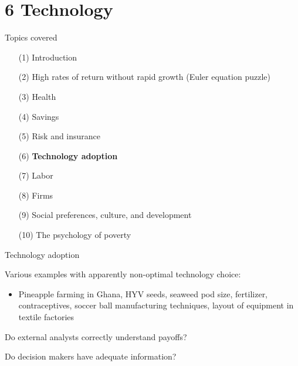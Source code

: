 \documentclass[aspectratio=169, 10pt, handout]{beamer}
\newenvironment{wideitemize}{\itemize\addtolength{\itemsep}{10pt}}{\enditemize}
\begin{document}
\section{6 Technology}

\begin{frame}{Topics covered}

\small 

\begin{enumerate}[(1)]

	\item[(1)] Introduction 
	
	\item[(2)] {High rates of return without rapid growth (Euler equation puzzle)}

	\item[(3)] {Health}
	
	\item[(4)] {Savings}
		
	\item[(5)] {Risk and insurance}

	\item[(6)] \textbf{Technology adoption}
	
	\item[(7)] Labor

	\item[(8)] Firms
	
	\item[(9)] Social preferences, culture, and development
	
	\item[(10)] The psychology of poverty

\end{enumerate}

\end{frame}


\begin{frame}{Technology adoption}

\begin{wideitemize}

	\item Various examples with apparently non-optimal technology choice:

	\begin{itemize}
	
		\item Pineapple farming in Ghana, HYV seeds, seaweed pod size, fertilizer, contraceptives, soccer ball manufacturing techniques, layout of equipment in textile factories

	\end{itemize}

	\item Do external analysts correctly understand payoffs?

	\item Do decision makers have adequate information?

	
\end{wideitemize}

\end{frame}
\end{document}
